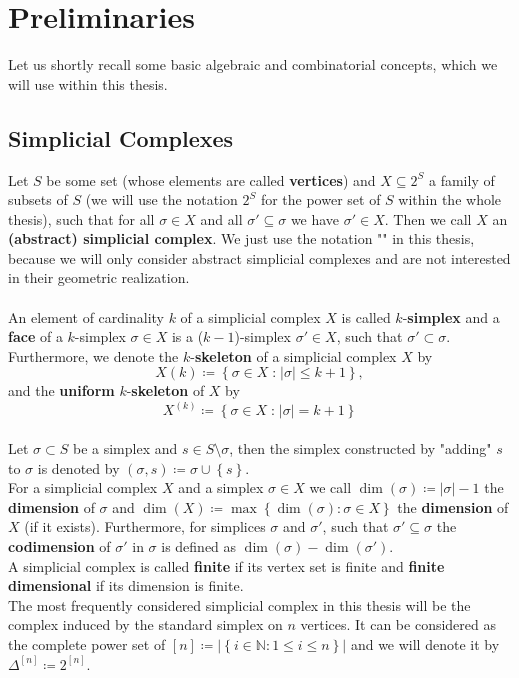 
\manualmark
{}

\chapter*{Preliminaries}

\label{Preliminaries}

Let us shortly recall some basic algebraic and combinatorial concepts, which we will use within this thesis.

\section*{Simplicial Complexes}

Let \(S\) be some set (whose elements are called \textbf{vertices}) and \(X\subseteq 2^S\) a family of subsets of \(S\) (we will use the notation \(2^S\) for the power set of \(S\) within the whole thesis), such that for all \(\sigma\in X\) and all \(\sigma'\subseteq\sigma\) we have \(\sigma'\in X\). Then we call \(X\) an \textbf{(abstract) simplicial complex}. We just use the notation "" in this thesis, because we will only consider abstract simplicial complexes and are not interested in their geometric realization.\\
\\
An element of cardinality \(k\) of a simplicial complex \(X\) is called \(k\)-\textbf{simplex} and a \textbf{face} of a \(k\)-simplex \(\sigma\in X\) is a (\(k-1\))-simplex \(\sigma'\in X\), such that \(\sigma'\subset\sigma\). Furthermore, we denote the \(k\)-\textbf{skeleton} of a simplicial complex \(X\) by
\[
X(k)\coloneqq \left\{\sigma\in X\;\text{:}\;\left|\sigma\right|\leq k+1\right\},
\]
and the \textbf{uniform} \(k\)-\textbf{skeleton} of \(X\) by
\[
X^{(k)}\coloneqq \left\{\sigma\in X\;\text{:}\;\left|\sigma\right|=k+1\right\}
\]
\\
Let \(\sigma\subset S\) be a simplex and \(s\in S\setminus\sigma\), then the simplex constructed by "adding" \(s\) to \(\sigma\) is denoted by \((\sigma,s)\coloneqq \sigma\cup\left\{s\right\}\).\\
For a simplicial complex \(X\) and a simplex \(\sigma\in X\) we call \(\dim(\sigma)\coloneqq |\sigma|-1\) the \textbf{dimension} of \(\sigma\) and \(\dim(X)\coloneqq \max\left\{\dim(\sigma):\sigma\in X\right\}\) the \textbf{dimension} of \(X\) (if it exists). Furthermore, for simplices \(\sigma\) and \(\sigma'\), such that \(\sigma'\subseteq\sigma\) the \textbf{codimension} of \(\sigma'\) in \(\sigma\) is defined as \(\dim(\sigma)-\dim(\sigma')\). 
\\
A simplicial complex is called \textbf{finite} if its vertex set is finite and \textbf{finite dimensional} if its dimension is finite.\\
The most frequently considered simplicial complex in this thesis will be the complex induced by the standard simplex on \(n\) vertices. It can be considered as the complete power set of \([n]\coloneqq \left|\left\{i\in\mathbb{N}:1\leq i\leq n\right\}\right|\) and we will denote it by \(\Delta^{[n]}\coloneqq 2^{[n]}\).

